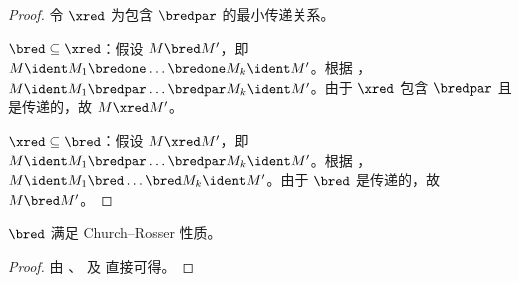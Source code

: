 \documentclass[../../../include/open-logic-section]{subfiles}
\begin{document}
\begin{proof}
  令 $\xred$ 为包含 $\bredpar$ 的最小传递关系。

  $\bred \subseteq \xred$：假设 $M \bred M'$，即 $M \ident M_1
  \bredone \dots \bredone M_k \ident M'$。根据 ，$M
  \ident M_1 \bredpar \dots \bredpar M_k \ident M'$。由于 $\xred$
  包含 $\bredpar$ 且是传递的，故 $M \xred M'$。

  $\xred \subseteq \bred$：假设 $M \xred M'$，即 $M
  \ident M_1 \bredpar \dots \bredpar M_k \ident M'$。根据 ，$M \ident M_1
  \bred \dots \bred M_k \ident M'$。由于 $\bred$ 是传递的，故 $M
  \bred M'$。
\end{proof}

\begin{thm}
  $\bred$ 满足 Church--Rosser 性质。
\end{thm}

\begin{proof}
  由 、 及  直接可得。
\end{proof}
\end{document}
